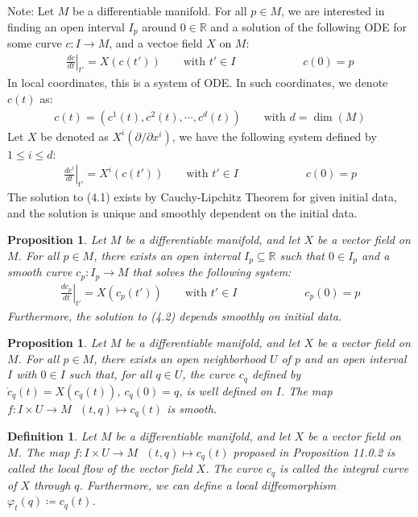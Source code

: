 \documentclass[11pt]{book}
\theoremstyle{break}
\theoremstyle{break}
\newtheorem{prop}[lem]{Proposition}
\newtheorem{defn}{Definition}[corL]
\newcommand{\R}{\mathbb{R}}
\newcommand{\pd}{\partial}
\newcommand{\note}{\color{red}Note: \color{black}}
\begin{document}
\note Let $M$ be a differentiable manifold. For all $p \in M$, we are interested in finding an open interval $I_p$ around $0 \in \R$ and a solution of the following ODE for some curve $c:I \to M$, and a vectoe field $X$ on $M$:
\begin{align*}
\left.\frac{dc}{dt}\right|_{t'} = X(c(t')) \qquad \text{with }t' \in I\qquad\qquad\qquad c(0) = p
\end{align*}
In local coordinates, this is a system of ODE. In such coordinates, we denote $c(t)$ as:
\begin{align*}
c(t) = (c^1(t), c^2(t), \cdots, c^d(t)) \qquad\text{with }d= \dim(M)
\end{align*}
Let $X$ be denoted as $X^i (\pd/\pd x^i)$, we have the following system defined by $1\leq i \leq d$:
\begin{align}
\left.\frac{dc^i}{dt}\right|_{t'} = X^i(c(t')) \qquad\text{with }t'\in I \qquad\qquad\qquad c(0) = p
\end{align}
The solution to (4.1) exists by Cauchy-Lipchitz Theorem for given initial data, and the solution is unique and smoothly dependent on the initial data. \\

\begin{prop}
Let $M$ be a differentiable manifold, and let $X$ be a vector field on $M$. For all $p \in M$, there exists an open interval $I_p \subseteq \R$ such that $0 \in I_p$ and a smooth curve $c_p:I_p \to M$ that solves the following system:
\begin{align}
\left.\frac{dc_p}{dt}\right|_{t'} = X(c_p(t'))\qquad \text{with }t' \in I \qquad\qquad\qquad c_p(0) = p
\end{align}
Furthermore, the solution to (4.2) depends smoothly on initial data.
\end{prop}

\begin{prop}
Let $M$ be a differentiable manifold, and let $X$ be a vector field on $M$. For all $p \in M$, there exists an open neighborhood $U$ of $p$ and an open interval $I$ with $0 \in I$ such that, for all $q \in U$, the curve $c_q$ defined by $\dot{c}_q(t) = X(c_q(t))$, $c_q(0) = q$, is well defined on $I$. The map $f:I\times U \to M \ \ \ (t,q) \mapsto c_q(t)$ is smooth. 
\end{prop}


\begin{defn}
Let $M$ be a differentiable manifold, and let $X$ be a vector field on $M$. The map $f:I \times  U \to M \ \ \ (t,q) \mapsto c_q(t)$ proposed in Proposition 11.0.2 is called the local flow of the vector field $X$. The curve $c_q$ is called the integral curve of $X$ through $q$. Furthermore,  we can define a local diffeomorphism $\varphi_t(q) \coloneqq c_q(t)$.
\end{defn}
\end{document}
